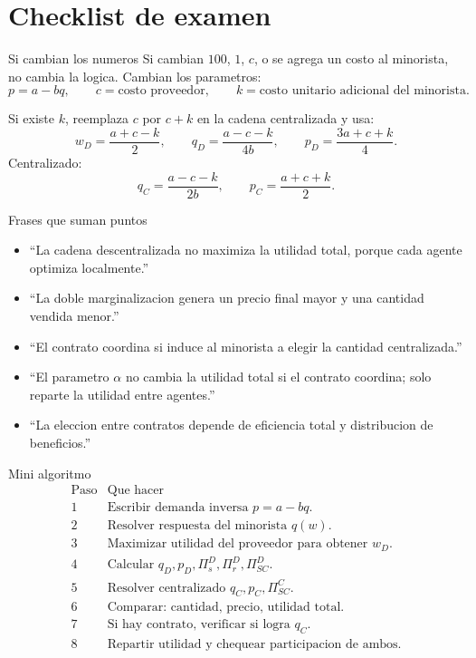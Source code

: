 \section{Checklist de examen}

\begin{trampa}{Si cambian los numeros}
Si cambian \(100\), \(1\), \(c\), o se agrega un costo al minorista, no cambia la logica. Cambian los parametros:
\[
p=a-bq,
\qquad
c=\text{costo proveedor},
\qquad
k=\text{costo unitario adicional del minorista}.
\]

Si existe \(k\), reemplaza \(c\) por \(c+k\) en la cadena centralizada y usa:
\[
w_D=\frac{a+c-k}{2},
\qquad
q_D=\frac{a-c-k}{4b},
\qquad
p_D=\frac{3a+c+k}{4}.
\]
Centralizado:
\[
q_C=\frac{a-c-k}{2b},
\qquad
p_C=\frac{a+c+k}{2}.
\]
\end{trampa}

\begin{materia}{Frases que suman puntos}
\begin{itemize}[itemsep=2pt]
    \item ``La cadena descentralizada no maximiza la utilidad total, porque cada agente optimiza localmente.''
    \item ``La doble marginalizacion genera un precio final mayor y una cantidad vendida menor.''
    \item ``El contrato coordina si induce al minorista a elegir la cantidad centralizada.''
    \item ``El parametro \(\alpha\) no cambia la utilidad total si el contrato coordina; solo reparte la utilidad entre agentes.''
    \item ``La eleccion entre contratos depende de eficiencia total y distribucion de beneficios.''
\end{itemize}
\end{materia}

\begin{materia}{Mini algoritmo}
\[
\begin{array}{c|l}
\text{Paso} & \text{Que hacer} \\
\hline
1 & \text{Escribir demanda inversa } p=a-bq.\\
2 & \text{Resolver respuesta del minorista } q(w).\\
3 & \text{Maximizar utilidad del proveedor para obtener } w_D.\\
4 & \text{Calcular } q_D,p_D,\Pi_s^D,\Pi_r^D,\Pi_{SC}^D.\\
5 & \text{Resolver centralizado } q_C,p_C,\Pi_{SC}^C.\\
6 & \text{Comparar: cantidad, precio, utilidad total.}\\
7 & \text{Si hay contrato, verificar si logra } q_C.\\
8 & \text{Repartir utilidad y chequear participacion de ambos.}
\end{array}
\]
\end{materia}

